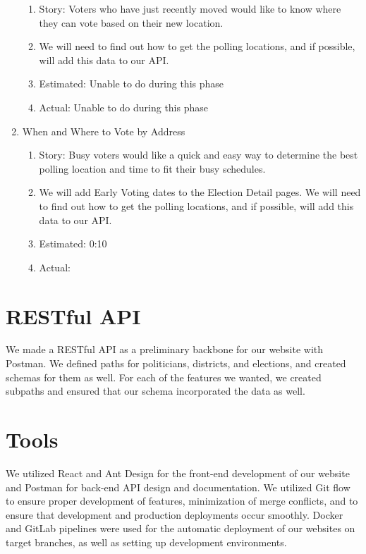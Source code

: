 \documentclass[11t]{article}
\begin{document}
\begin{enumerate}
\begin{enumerate}
        \item Story: Voters who have just recently moved would like to know where they can vote based on their new location.
        \item We will need to find out how to get the polling locations, and if possible, will add this data to our API.
        \item Estimated: Unable to do during this phase
        \item Actual: Unable to do during this phase
    \end{enumerate}
    \item When and Where to Vote by Address
    \begin{enumerate}
        \item Story: Busy voters would like a quick and easy way to determine the best polling location and time to fit their busy schedules.
        \item We will add Early Voting dates to the Election Detail pages. We will need to find out how to get the polling locations, and if possible, will add this data to our API.
        \item Estimated: 0:10
        \item Actual:
    \end{enumerate}
\end{enumerate}

\section{RESTful API}
We made a RESTful API as a preliminary backbone for our website with Postman. We defined paths for politicians, districts, and elections, and created schemas for them as well. For each of the features we wanted, we created subpaths and ensured that our schema incorporated the data as well. 

\section{Tools}
We utilized React and Ant Design for the front-end development of our website and Postman for back-end API design and documentation. We utilized Git flow to ensure proper development of features, minimization of merge conflicts, and to ensure that development and production deployments occur smoothly. Docker and GitLab pipelines were used for the automatic deployment of our websites on target branches, as well as setting up development environments.
\end{document}
